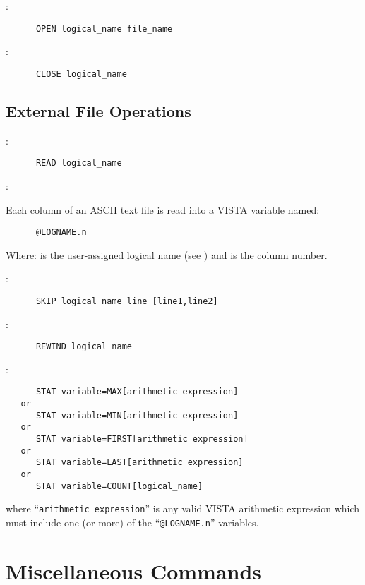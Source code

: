 \noindent {}:
\begin{verbatim}
      OPEN logical_name file_name
\end{verbatim}

\noindent {}:
\begin{verbatim}
      CLOSE logical_name
\end{verbatim}

\subsection{External File Operations}

:
\begin{verbatim}
      READ logical_name
\end{verbatim}

\noindent {}:

Each column of an ASCII text file is read into a VISTA variable
named:
\begin{verbatim}
      @LOGNAME.n
\end{verbatim}
Where:  is the user-assigned logical name (see )
and  is the column number.

\noindent {}:
\begin{verbatim}
      SKIP logical_name line [line1,line2]
\end{verbatim}

\noindent {}:
\begin{verbatim}
      REWIND logical_name
\end{verbatim}

\noindent {}:
\begin{verbatim}
      STAT variable=MAX[arithmetic expression]
   or
      STAT variable=MIN[arithmetic expression]
   or
      STAT variable=FIRST[arithmetic expression]
   or
      STAT variable=LAST[arithmetic expression]
   or
      STAT variable=COUNT[logical_name]
\end{verbatim}
where ``{\tt arithmetic expression}'' is any valid VISTA arithmetic expression
which must include one (or more) of the ``{\tt @LOGNAME.n}'' variables.


\section{Miscellaneous Commands}

